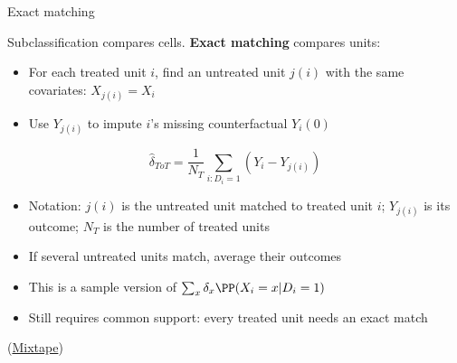 \documentclass[compress, 8pt]{beamer}
\begin{document}
\begin{frame}{Exact matching}

Subclassification compares cells. \textbf{Exact matching} compares units:
\begin{itemize}
    \item For each treated unit $i$, find an untreated unit $j(i)$ with the same covariates: $X_{j(i)} = X_i$
    \item Use $Y_{j(i)}$ to impute $i$'s missing counterfactual $Y_i(0)$
\end{itemize}
\begin{equation*}
    \hat{\delta}_{ToT} = \frac{1}{N_T} \sum_{i: D_i = 1} \left( Y_i - Y_{j(i)} \right)
\end{equation*}
\begin{itemize}
    \item {\color{DarkGray}Notation: $j(i)$ is the untreated unit matched to treated unit $i$; $Y_{j(i)}$ is its outcome; $N_T$ is the number of treated units}
    \item If several untreated units match, average their outcomes
    \item This is a sample version of $\sum_x \delta_x \PP(X_i = x \vert D_i = 1)$
    \item Still requires common support: every treated unit needs an exact match
\end{itemize}
(\href{https://mixtape.scunning.com/05-causal_cross_sectional_designs\#exact-matching}{Mixtape})

\end{frame}
\end{document}
